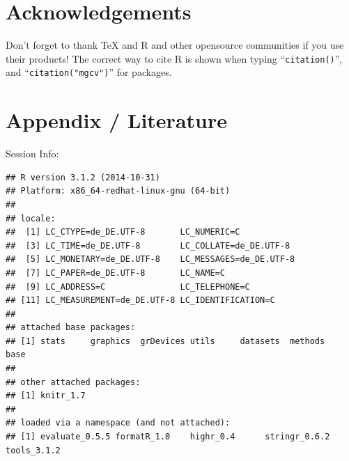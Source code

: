 \documentclass[11pt, a4paper]{article}\usepackage[]{graphicx}\usepackage[]{color}
\makeatletter
\newenvironment{kframe}{%
 \def\at@end@of@kframe{}%
 \ifinner\ifhmode%
  \def\at@end@of@kframe{\end{minipage}}%
  \begin{minipage}{\columnwidth}%
 \fi\fi%
 \def\FrameCommand##1{\hskip\@totalleftmargin \hskip-\fboxsep
 \colorbox{shadecolor}{##1}\hskip-\fboxsep
     \hskip-\linewidth \hskip-\@totalleftmargin \hskip\columnwidth}%
 \MakeFramed {\advance\hsize-\width
   \@totalleftmargin\z@ \linewidth\hsize
   \@setminipage}}%
 {\par\unskip\endMakeFramed%
 \at@end@of@kframe}
\newenvironment{knitrout}{}{} %
\makeatother
\begin{document}
\section{Acknowledgements}
Don't forget to thank TeX and R and other opensource communities if you use their products! The correct way to cite R is shown when typing ``\texttt{citation()}'', and ``\texttt{citation("mgcv")}'' for packages.

\section{Appendix / Literature}

Session Info:
\begin{knitrout}
\color{fgcolor}\begin{kframe}
\begin{verbatim}
## R version 3.1.2 (2014-10-31)
## Platform: x86_64-redhat-linux-gnu (64-bit)
## 
## locale:
##  [1] LC_CTYPE=de_DE.UTF-8       LC_NUMERIC=C              
##  [3] LC_TIME=de_DE.UTF-8        LC_COLLATE=de_DE.UTF-8    
##  [5] LC_MONETARY=de_DE.UTF-8    LC_MESSAGES=de_DE.UTF-8   
##  [7] LC_PAPER=de_DE.UTF-8       LC_NAME=C                 
##  [9] LC_ADDRESS=C               LC_TELEPHONE=C            
## [11] LC_MEASUREMENT=de_DE.UTF-8 LC_IDENTIFICATION=C       
## 
## attached base packages:
## [1] stats     graphics  grDevices utils     datasets  methods   base     
## 
## other attached packages:
## [1] knitr_1.7
## 
## loaded via a namespace (and not attached):
## [1] evaluate_0.5.5 formatR_1.0    highr_0.4      stringr_0.6.2  tools_3.1.2
\end{verbatim}
\end{kframe}
\end{knitrout}
\end{document}
